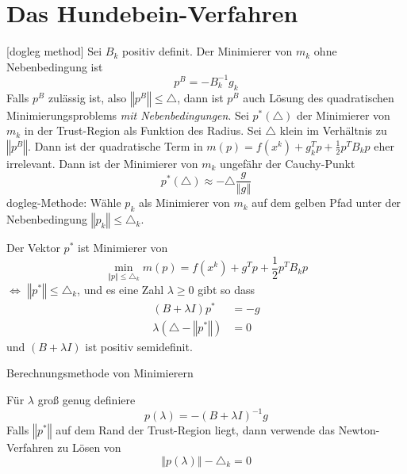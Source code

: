 \section{Das Hundebein-Verfahren}[dogleg method]
Sei $B_k$ positiv definit. Der Minimierer von $m_k$ ohne Nebenbedingung ist \begin{equation*}
	p^B=-B_k^{-1}g_k
\end{equation*}
Falls $p^B$ zulässig ist, also $\left\Vert p^B \right\Vert \leq \triangle$, dann ist $p^B$ auch Lösung des quadratischen Minimierungsproblems \emph{mit Nebenbedingungen}. Sei $p^* ( \triangle )$ der Minimierer von $m_k$ in der Trust-Region als Funktion des Radius. Sei $\triangle$ klein im Verhältnis zu $\left\Vert p^B \right\Vert$. Dann ist der quadratische Term in $m(p)=f (x^k )+g_k^Tp+\frac{1}{2}p^TB_kp$ eher irrelevant. Dann ist der Minimierer von $m_k$ ungefähr der Cauchy-Punkt \begin{equation*}
	p^* ( \triangle ) \approx -\triangle \frac{g}{\left\Vert g \right\Vert}
\end{equation*}
dogleg-Methode: Wähle $p_k$ als Minimierer von $m_k$ auf dem gelben Pfad unter der Nebenbedingung $\left\Vert p_k \right\Vert \leq \triangle_k$.
\begin{satz}
Der Vektor $p^*$ ist Minimierer von \begin{equation*}
	\min_{\left\Vert p \right\Vert \leq \triangle_k} m(p)=f (x^k )+g^Tp+\frac{1}{2}p^TB_kp
\end{equation*}
$\iff$ $\left\Vert p^* \right\Vert \leq \triangle_k$, und es eine Zahl $\lambda \geq 0$ gibt so dass \begin{align*}
	(B+ \lambda I )p^* & =-g \\
	\lambda ( \triangle-\left\Vert p^* \right\Vert ) & = 0
\end{align*}
und $(B+\lambda I )$ ist positiv semidefinit.
\end{satz}
Berechnungsmethode von Minimierern
\begin{algo}
Für $\lambda$ groß genug definiere \begin{equation*}
	p ( \lambda )=- (B+\lambda I )^{-1}g
\end{equation*}
Falls $\left\Vert p^* \right\Vert$ auf dem Rand der Trust-Region liegt, dann verwende das Newton-Verfahren zu Lösen von \begin{equation*}
	\left\Vert p ( \lambda ) \right\Vert-\triangle_k=0
\end{equation*}
\end{algo}

